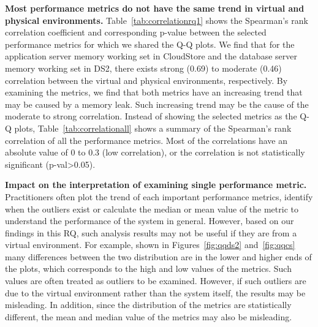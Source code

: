 \documentclass[smallextended]{svjour3}       %
\begin{document}
\textbf{Most performance metrics do not have the same trend in virtual and physical environments.} Table~\ref{tab:correlationrq1} shows the Spearman's rank correlation coefficient and corresponding p-value between the selected performance metrics for which we shared the Q-Q plots. We find that for the application server memory working set in CloudStore and the database server memory working set in DS2, there exists strong (0.69) to moderate (0.46) correlation between the virtual and physical environments, respectively. By examining the metrics, we find that both metrics have an increasing trend that may be caused by a memory leak. Such increasing trend may be the cause of the moderate to strong correlation. Instead of showing the selected metrics as the Q-Q plots, Table~\ref{tab:correlationall} shows a summary of the Spearman's rank correlation of all the performance metrics. Most of the correlations have an absolute value of 0 to 0.3 (low correlation), or the correlation is not statistically significant (p-val\textgreater0.05).

\textbf{Impact on the interpretation of examining single performance metric.} Practitioners often plot the trend of each important performance metrics, identify when the outliers exist or calculate the median or mean value of the metric to understand the performance of the system in general. However, based on our findings in this RQ, such analysis results may not be useful if they are from a virtual environment. For example, shown in Figures~\ref{fig:qqds2} and~\ref{fig:qqcs} many differences between the two distribution are in the lower and higher ends of the plots, which corresponds to the high and low values of the metrics. Such values are often treated as outliers to be examined. However, if such outliers are due to the virtual environment rather than the system itself, the results may be misleading. In addition, since the distribution of the metrics are statistically different, the mean and median value of the metrics may also be misleading. 

\noindent{}
\end{document}
